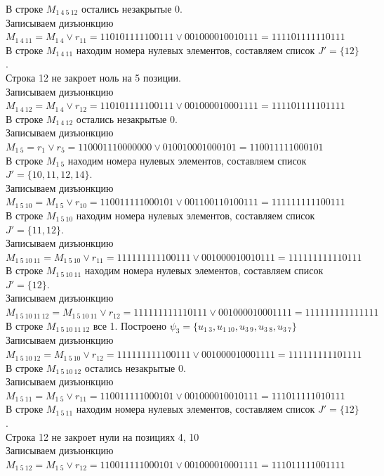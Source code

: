 \documentclass[a4paper,12pt]{article}
\begin{document}
В строке $M_{1\ 4\ 5\ 12}$ остались незакрытые 0.\\
Записываем дизъюнкцию $M_{1\ 4\ 11} = M_{1\ 4}\lor r_{11} = 110101111100111 \lor 001000010010111 = 111101111110111$\\
В строке $M_{1\ 4\ 11}$ находим номера нулевых элементов, составляем список $J' = \{12\}$.\\
Строка 12 не закроет ноль на 5 позиции.\\
Записываем дизъюнкцию $M_{1\ 4\ 12} = M_{1\ 4}\lor r_{12} = 110101111100111 \lor 001000010001111 = 111101111101111$\\
В строке $M_{1\ 4\ 12}$ остались незакрытые 0.\\
Записываем дизъюнкцию $M_{1\ 5} = r_{1}\lor r_{5} = 110001110000000 \lor 010010001000101 = 110011111000101$\\
В строке $M_{1\ 5}$ находим номера нулевых элементов, составляем список $J' = \{10, 11, 12, 14\}$.\\
Записываем дизъюнкцию $M_{1\ 5\ 10} = M_{1\ 5}\lor r_{10} = 110011111000101 \lor 001100110100111 = 111111111100111$\\
В строке $M_{1\ 5\ 10}$ находим номера нулевых элементов, составляем список $J' = \{11, 12\}$.\\
Записываем дизъюнкцию $M_{1\ 5\ 10\ 11} = M_{1\ 5\ 10}\lor r_{11} = 111111111100111 \lor 001000010010111 = 111111111110111$\\
В строке $M_{1\ 5\ 10\ 11}$ находим номера нулевых элементов, составляем список $J' = \{12\}$.\\
Записываем дизъюнкцию $M_{1\ 5\ 10\ 11\ 12} = M_{1\ 5\ 10\ 11}\lor r_{12} = 111111111110111 \lor 001000010001111 = 111111111111111$\\
В строке $M_{1\ 5\ 10\ 11\ 12}$ все 1. Построено $\psi_{3} = \{u_{1\ 3},u_{1\ 10},u_{3\ 9},u_{3\ 8},u_{3\ 7}\}$\\
Записываем дизъюнкцию $M_{1\ 5\ 10\ 12} = M_{1\ 5\ 10}\lor r_{12} = 111111111100111 \lor 001000010001111 = 111111111101111$\\
В строке $M_{1\ 5\ 10\ 12}$ остались незакрытые 0.\\
Записываем дизъюнкцию $M_{1\ 5\ 11} = M_{1\ 5}\lor r_{11} = 110011111000101 \lor 001000010010111 = 111011111010111$\\
В строке $M_{1\ 5\ 11}$ находим номера нулевых элементов, составляем список $J' = \{12\}$.\\
Строка 12 не закроет нули на позициях 4, 10\\
Записываем дизъюнкцию $M_{1\ 5\ 12} = M_{1\ 5}\lor r_{12} = 110011111000101 \lor 001000010001111 = 111011111001111$\\
\end{document}
